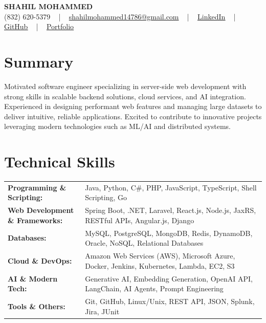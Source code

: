 \documentclass[letterpaper,11pt]{article}
\begin{document}
\begin{center}
    {\fontsize{14pt}{12pt}\selectfont \textbf{\MakeUppercase{Shahil Mohammed}}}\\ \vspace{2pt}
    \fontsize{10pt}{12pt}\selectfont (832) 620-5379 ~ | ~ \href{mailto:shahilmohammed14786@gmail.com}{shahilmohammed14786@gmail.com} ~ | ~  
    \href{https://www.linkedin.com/in/shahil-mohammed-9652931a1/}{\color{blue}\underline{LinkedIn}}  ~ | ~ 
    \href{https://github.com/freakbeast14}{\color{blue}\underline{GitHub}} ~ | ~ 
    \href{https://shahil-mohammed.netlify.app/}{\color{blue}\underline{Portfolio}}
    \vspace{-8pt}
\end{center}

\section{Summary}
\fontsize{9pt}{10pt}\selectfont
Motivated software engineer specializing in server-side web development with strong skills in scalable backend solutions, cloud services, and AI integration. Experienced in designing performant web features and managing large datasets to deliver intuitive, reliable applications. Excited to contribute to innovative projects leveraging modern technologies such as ML/AI and distributed systems.
 \vspace{-5pt}
 
\section{Technical Skills}
        \vspace{-14pt}
        \begin{table}[h]
            \fontsize{9pt}{10pt}\selectfont
            \begin{tabular}{p{0.3\linewidth} p{0.7\linewidth}}
                \textbf{Programming \& Scripting:} & Java, Python, C\#, PHP, JavaScript, TypeScript, Shell Scripting, Go \\
                \textbf{Web Development \& Frameworks:} & Spring Boot, .NET, Laravel, React.js, Node.js, JaxRS, RESTful APIs, Angular.js, Django \\
                \textbf{Databases:} & MySQL, PostgreSQL, MongoDB, Redis, DynamoDB, Oracle, NoSQL, Relational Databases \\
                \textbf{Cloud \& DevOps:} & Amazon Web Services (AWS), Microsoft Azure, Docker, Jenkins, Kubernetes, Lambda, EC2, S3 \\
                \textbf{AI \& Modern Tech:} & Generative AI, Embedding Generation, OpenAI API, LangChain, AI Agents, Prompt Engineering \\
                \textbf{Tools \& Others:} & Git, GitHub, Linux/Unix, REST API, JSON, Splunk, Jira, JUnit \\
            \end{tabular}
        \end{table}
 \vspace{-15pt}
 
\end{document}
